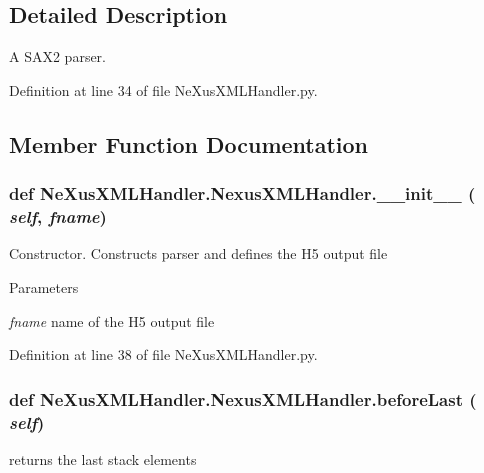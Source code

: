 \subsection{Detailed Description}
A SAX2 parser. 

Definition at line 34 of file NeXusXMLHandler.py.

\subsection{Member Function Documentation}
\hypertarget{classNeXusXMLHandler_1_1NexusXMLHandler_a932ed87e64e19d770ad409c5bb8c9a55}{
\subsubsection[{\_\-\_\-init\_\-\_\-}]{\setlength{\rightskip}{0pt plus 5cm}def NeXusXMLHandler.NexusXMLHandler.\_\-\_\-init\_\-\_\- ( {\em self}, \/   {\em fname})}}
\label{classNeXusXMLHandler_1_1NexusXMLHandler_a932ed87e64e19d770ad409c5bb8c9a55}


Constructor. Constructs parser and defines the H5 output file 
\begin{DoxyParams}{Parameters}
\item[{\em fname}]name of the H5 output file \end{DoxyParams}


Definition at line 38 of file NeXusXMLHandler.py.\hypertarget{classNeXusXMLHandler_1_1NexusXMLHandler_a6a6ef821d7ec895546fdf3d4385e675a}{
\subsubsection[{beforeLast}]{\setlength{\rightskip}{0pt plus 5cm}def NeXusXMLHandler.NexusXMLHandler.beforeLast ( {\em self})}}
\label{classNeXusXMLHandler_1_1NexusXMLHandler_a6a6ef821d7ec895546fdf3d4385e675a}
\begin{DoxyVerb}returns the last stack elements \end{DoxyVerb}
 


